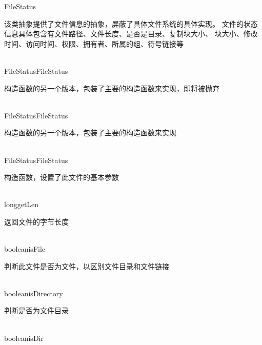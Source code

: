 \begin{XeClass}{FileStatus}
   
 该类抽象提供了文件信息的抽象，屏蔽了具体文件系统的具体实现。
 文件的状态信息具体包含有文件路径、文件长度、是否是目录、复制块大小、
 块大小、修改时间、访问时间、权限、拥有者、所属的组、符号链接等

  \begin{XeMethod}{\XePublic\\ }{FileStatus}{FileStatus}
       
 构造函数的另一个版本，包装了主要的构造函数来实现，即将被抛弃

  \end{XeMethod}

  \begin{XeMethod}{\XePublic\\ }{FileStatus}{FileStatus}
       
 构造函数的另一个版本，包装了主要的构造函数来实现

  \end{XeMethod}

  \begin{XeMethod}{\XePublic\\ }{FileStatus}{FileStatus}
       
 构造函数，设置了此文件的基本参数

  \end{XeMethod}

  \begin{XeMethod}{\XePublic\\ }{long}{getLen}
       
 返回文件的字节长度

  \end{XeMethod}

  \begin{XeMethod}{\XePublic\\ }{boolean}{isFile}
       
 判断此文件是否为文件，以区别文件目录和文件链接

  \end{XeMethod}

  \begin{XeMethod}{\XePublic\\ }{boolean}{isDirectory}
       
 判断是否为文件目录

  \end{XeMethod}

  \begin{XeMethod}{\XePublic\\ }{boolean}{isDir}
       

\end{XeMethod}
\end{XeClass}
